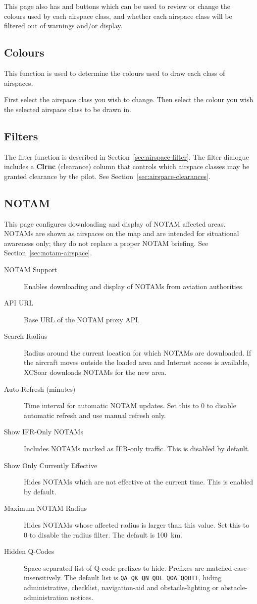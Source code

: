 This page also has  and  buttons which
can be used to review or change the colours used by each
airspace class, and whether each airspace class will be filtered out
of warnings and/or display. 

\subsection*{Colours}
This function is used to determine the colours used to draw each class of
airspaces.

First select the airspace class you wish to change. Then select the colour
you wish the selected airspace class to be drawn in.

\subsection*{Filters}
The filter function is described in Section~\ref{sec:airspace-filter}.
The filter dialogue includes a \textbf{Clrnc} (clearance) column that
controls which airspace classes may be granted clearance by the pilot.
See Section~\ref{sec:airspace-clearances}.

\subsection*{NOTAM}

This page configures downloading and display of NOTAM affected areas.
NOTAMs are shown as airspaces on the map and are intended for
situational awareness only; they do not replace a proper NOTAM briefing.
See Section~\ref{sec:notam-airspace}.

\begin{description}
\item[NOTAM Support]  Enables downloading and display of NOTAMs from
  aviation authorities.
\item[API URL]  Base URL of the NOTAM proxy API.
\item[Search Radius]  Radius around the current location for which NOTAMs
  are downloaded.  If the aircraft moves outside the loaded area and
  Internet access is available, XCSoar downloads NOTAMs for the new area.
\item[Auto-Refresh (minutes)]  Time interval for automatic NOTAM updates.
  Set this to 0 to disable automatic refresh and use manual refresh only.
\item[Show IFR-Only NOTAMs]  Includes NOTAMs marked as IFR-only traffic.
  This is disabled by default.
\item[Show Only Currently Effective]  Hides NOTAMs which are not effective
  at the current time.  This is enabled by default.
\item[Maximum NOTAM Radius]  Hides NOTAMs whose affected radius is larger
  than this value.  Set this to 0 to disable the radius filter.  The
  default is 100~km.
\item[Hidden Q-Codes]  Space-separated list of Q-code prefixes to hide.
  Prefixes are matched case-insensitively.  The default list is
  \texttt{QA QK QN QOL QOA QOBTT}, hiding administrative, checklist,
  navigation-aid and obstacle-lighting or obstacle-administration notices.
\end{description}

